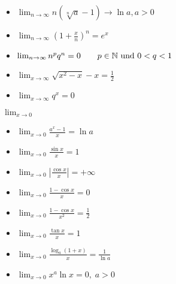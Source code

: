 \begin{itemize}[leftmargin=*]
	\item $\lim_{n \to \infty} n(\sqrt[n]{a} - 1) \rightarrow \ln a, a > 0$
	\item $\lim_{n \to \infty} \left( 1+\frac{x}{n} \right)^n = e^x \quad$
	\item $\lim_{n \to \infty} n^p q^n = 0 \qquad p \in \mathbb{N} \text{ und } 0 < q < 1$
	\item $\lim_{x \to \infty} \sqrt{x^2-x}-x = \frac{1}{2}$
	\item $\lim_{x \to \infty} q^x = 0$
\end{itemize}
$\lim_{x \to 0}$
\begin{itemize}[leftmargin=*]
	\item $\lim_{x \to 0} \frac{a^x - 1}{x} = \ln a$
	\item $\lim_{x \to 0} \frac{\sin x}{x} = 1$
	\item $\lim_{x \to 0} \left| \frac{\cos x}{x} \right| = +\infty$
	\item $\lim_{x \to 0} \frac{1 - \cos x}{x} = 0$
	\item $\lim_{x \to 0} \frac{1 - \cos x}{x^2} = \frac{1}{2}$
	\item $\lim_{x \to 0} \frac{\tan x}{x} = 1$
	\item $\lim_{x \to 0} \frac{\log_a (1 + x)}{x} = \frac{1}{\ln a}$
	\item $\lim_{x \to 0} x^a \ln x = 0, \; a  > 0$
\end{itemize}

